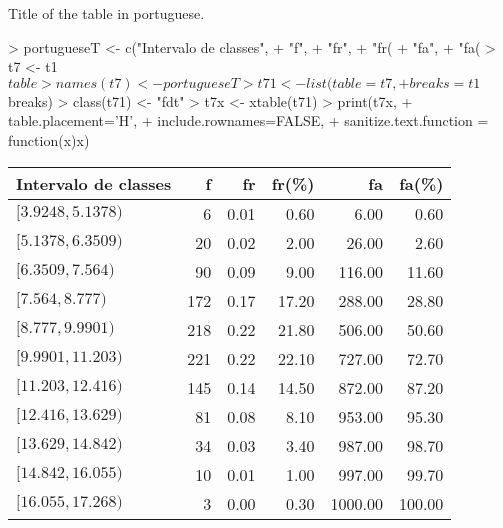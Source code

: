 \documentclass[10pt,a4paper]{article}
\begin{document}
Title of the table in portuguese.

\begin{Schunk}
\begin{Sinput}
> portugueseT <- c("Intervalo de classes",
+                  "f",
+                  "fr",
+                  "fr(%)",
+                  "fa",
+                  "fa(%)")
> t7 <- t1$table
> names(t7) <- portugueseT
> t71 <- list(table=t7,
+             breaks=t1$breaks)
> class(t71) <- "fdt"
> t7x <- xtable(t71)
> print(t7x,
+       table.placement='H',
+       include.rownames=FALSE,
+       sanitize.text.function = function(x){x})
\end{Sinput}
% latex table generated in R 4.4.0 by xtable 1.8-4 package
% Fri Nov 17 16:34:40 2023
\begin{table}[H]
\centering
\begin{tabular}{lrrrrr}
  \hline
Intervalo de classes & f & fr & fr(\%) & fa & fa(\%) \\ 
  \hline
$[3.9248,5.1378)$ &   6 & 0.01 & 0.60 & 6.00 & 0.60 \\ 
  $[5.1378,6.3509)$ &  20 & 0.02 & 2.00 & 26.00 & 2.60 \\ 
  $[6.3509,7.564)$ &  90 & 0.09 & 9.00 & 116.00 & 11.60 \\ 
  $[7.564,8.777)$ & 172 & 0.17 & 17.20 & 288.00 & 28.80 \\ 
  $[8.777,9.9901)$ & 218 & 0.22 & 21.80 & 506.00 & 50.60 \\ 
  $[9.9901,11.203)$ & 221 & 0.22 & 22.10 & 727.00 & 72.70 \\ 
  $[11.203,12.416)$ & 145 & 0.14 & 14.50 & 872.00 & 87.20 \\ 
  $[12.416,13.629)$ &  81 & 0.08 & 8.10 & 953.00 & 95.30 \\ 
  $[13.629,14.842)$ &  34 & 0.03 & 3.40 & 987.00 & 98.70 \\ 
  $[14.842,16.055)$ &  10 & 0.01 & 1.00 & 997.00 & 99.70 \\ 
  $[16.055,17.268)$ &   3 & 0.00 & 0.30 & 1000.00 & 100.00 \\ 
   \hline
\end{tabular}
\end{table}\end{Schunk}
\end{document}
